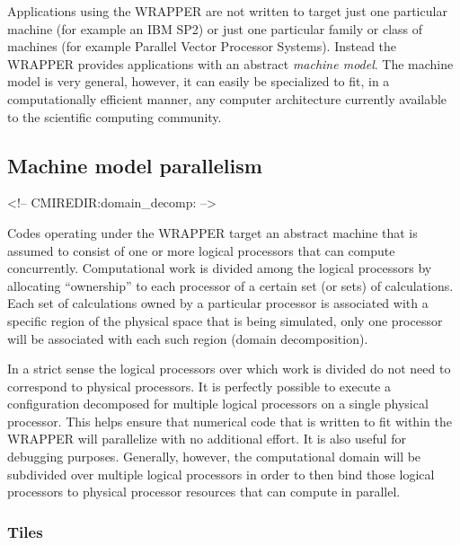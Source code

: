 Applications using the WRAPPER are not written to target just one
particular machine (for example an IBM SP2) or just one particular
family or class of machines (for example Parallel Vector Processor
Systems). Instead the WRAPPER provides applications with an abstract
{\it machine model}. The machine model is very general, however, it
can easily be specialized to fit, in a computationally efficient
manner, any computer architecture currently available to the
scientific computing community.

\subsection{Machine model parallelism}
\label{sec:domain_decomposition}
\begin{rawhtml}
<!-- CMIREDIR:domain_decomp: -->
\end{rawhtml}

Codes operating under the WRAPPER target an abstract machine that is
assumed to consist of one or more logical processors that can compute
concurrently.  Computational work is divided among the logical
processors by allocating ``ownership'' to each processor of a certain
set (or sets) of calculations. Each set of calculations owned by a
particular processor is associated with a specific region of the
physical space that is being simulated, only one processor will be
associated with each such region (domain decomposition).

In a strict sense the logical processors over which work is divided do
not need to correspond to physical processors.  It is perfectly
possible to execute a configuration decomposed for multiple logical
processors on a single physical processor.  This helps ensure that
numerical code that is written to fit within the WRAPPER will
parallelize with no additional effort.  It is also useful for
debugging purposes.  Generally, however, the computational domain will
be subdivided over multiple logical processors in order to then bind
those logical processors to physical processor resources that can
compute in parallel.

\subsubsection{Tiles}


